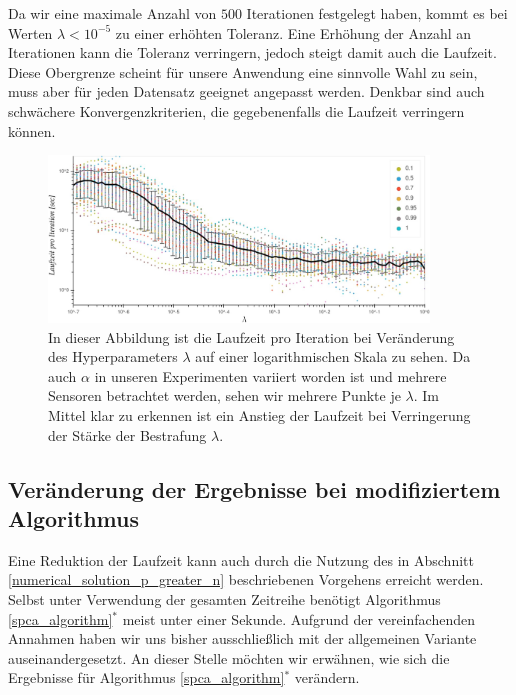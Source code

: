 Da wir eine maximale Anzahl von $500$ Iterationen festgelegt haben, kommt es bei Werten $\lambda < 10^{-5}$ zu einer erhöhten Toleranz. Eine Erhöhung der Anzahl an Iterationen kann die Toleranz verringern, jedoch steigt damit auch die Laufzeit. Diese Obergrenze scheint für unsere Anwendung eine sinnvolle Wahl zu sein, muss aber für jeden Datensatz geeignet angepasst werden. Denkbar sind auch schwächere Konvergenzkriterien, die gegebenenfalls die Laufzeit verringern können.

\begin{figure}
\centering
\includegraphics[width = 0.9\textwidth]{figures/run_time_per_iteration.jpg}
\caption{In dieser Abbildung ist die Laufzeit pro Iteration bei Veränderung des Hyperparameters $\lambda$ auf einer logarithmischen Skala zu sehen. Da auch $\alpha$ in unseren Experimenten variiert worden ist und mehrere Sensoren betrachtet werden, sehen wir mehrere Punkte je $\lambda$. Im Mittel klar zu erkennen ist ein Anstieg der Laufzeit bei Verringerung der Stärke der Bestrafung $\lambda$.}
\label{run_time_per_iteration}
\end{figure}




\subsection{Veränderung der Ergebnisse bei modifiziertem Algorithmus}
\label{comparison_special_case}

Eine Reduktion der Laufzeit kann auch durch die Nutzung des in Abschnitt \ref{numerical_solution_p_greater_n} beschriebenen Vorgehens erreicht werden. Selbst unter Verwendung der gesamten Zeitreihe benötigt Algorithmus \ref{spca_algorithm}$^*$ meist unter einer Sekunde. Aufgrund der vereinfachenden Annahmen haben wir uns bisher ausschließlich mit der allgemeinen Variante auseinandergesetzt. An dieser Stelle möchten wir erwähnen, wie sich die Ergebnisse für Algorithmus \ref{spca_algorithm}$^*$ verändern.

